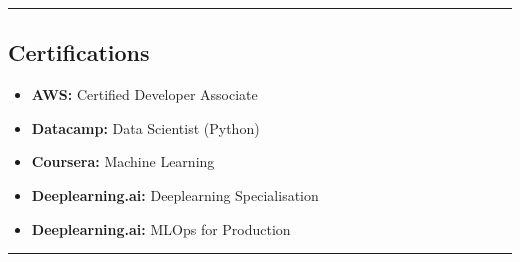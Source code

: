 \documentclass[11pt,a4paper]{article}
\begin{document}

\hrule
\vspace{-1em}
\subsection*{\Large Certifications}
\begin{itemize}[leftmargin=1em,noitemsep]
        \item \textbf{AWS:} Certified Developer Associate
        \item \textbf{Datacamp:} Data Scientist (Python)
        \item \textbf{Coursera: } Machine Learning
        \item \textbf{Deeplearning.ai: } Deeplearning Specialisation
        \item \textbf{Deeplearning.ai:} MLOps for Production
\end{itemize}
\hrule
\end{document}
